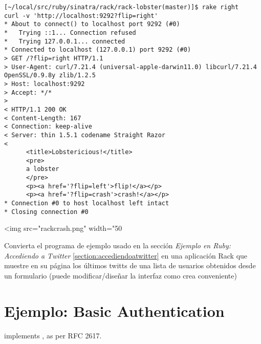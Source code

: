 \begin{verbatim}
[~/local/src/ruby/sinatra/rack/rack-lobster(master)]$ rake right
curl -v 'http://localhost:9292?flip=right'
* About to connect() to localhost port 9292 (#0)
*   Trying ::1... Connection refused
*   Trying 127.0.0.1... connected
* Connected to localhost (127.0.0.1) port 9292 (#0)
> GET /?flip=right HTTP/1.1
> User-Agent: curl/7.21.4 (universal-apple-darwin11.0) libcurl/7.21.4 OpenSSL/0.9.8y zlib/1.2.5
> Host: localhost:9292
> Accept: */*
> 
< HTTP/1.1 200 OK
< Content-Length: 167
< Connection: keep-alive
< Server: thin 1.5.1 codename Straight Razor
< 
      <title>Lobstericious!</title>
      <pre>
      a lobster
      </pre>
      <p><a href='?flip=left'>flip!</a></p>
      <p><a href='?flip=crash'>crash!</a></p>
* Connection #0 to host localhost left intact
* Closing connection #0
\end{verbatim}


\begin{rawhtml}
<img src="rackcrash.png" width="50%
\end{rawhtml}

Convierta el programa 
de ejemplo usado en la sección
{\it Ejemplo en Ruby: Accediendo a Twitter}
\ref{section:accediendoatwitter}
en una aplicación Rack que muestre en su página 
los últimos twitts de una lista de usuarios obtenidos 
desde un formulario (puede modificar/diseñar la interfaz como crea conveniente)

\section{Ejemplo: Basic Authentication}

\rackauthbasic{} implements 
, as per RFC 2617.


